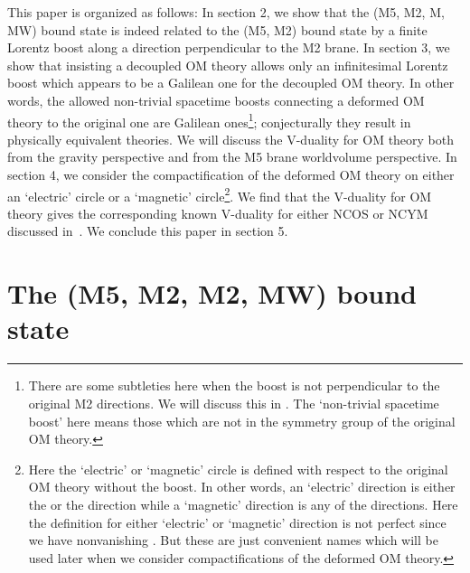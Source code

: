 \documentclass[a4paper,12pt]{article}
\providecommand{\sect}[1]{\setcounter{equation}{0}\section{#1}}
\begin{document}
	This paper is organized as follows: In section 2, we show 
that the (M5, M2, M\coordHE{}, MW) bound state is indeed related to the (M5, M2)
bound state by a finite Lorentz boost along a direction perpendicular 
to the M2 brane. In section 3, we show that insisting a decoupled OM 
theory allows only an infinitesimal Lorentz boost which appears to be 
a Galilean one for the decoupled OM theory. In other words, the allowed
non-trivial spacetime boosts connecting a deformed OM theory to the 
original one are Galilean ones\footnote{There are some subtleties
here when the boost is not perpendicular to the original M2
directions. We will discuss this in \cite{clwone}. The `non-trivial
spacetime boost' here means those which are not in the symmetry group
\coordHE{} of the original OM theory.}; conjecturally they result in 
physically equivalent theories.  
We will discuss the V-duality for OM theory both from the gravity 
perspective and from the M5 brane worldvolume
perspective.
In section 4, we consider the compactification of the deformed OM
theory on either an `electric' circle or a `magnetic' circle\footnote{
Here the `electric' or `magnetic' circle is defined with respect to the 
original OM theory without the boost. In other words, an `electric'
direction is either the \coordHE{} or the \coordHE{} direction while a `magnetic'
direction is any of the \coordHE{} directions. Here the definition
for either `electric' or `magnetic' direction is not perfect since 
we have nonvanishing \coordHE{}. But these are just  convenient names which
will be used later when we consider compactifications of the deformed
OM theory.}. We find that
the V-duality for OM theory gives the corresponding known V-duality for
either NCOS or NCYM discussed in~\cite{CW,CLW}. We conclude this paper in
section 5.



\sect{The (M5, M2, M2\coordHE{}, MW) bound state}
\end{document}
